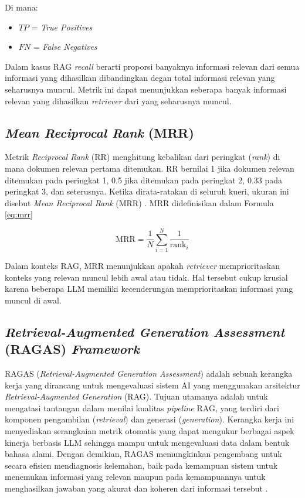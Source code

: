 Di mana:
\begin{itemize}
	\item $TP$ = \textit{True Positives}
	\item $FN$ = \textit{False Negatives}
\end{itemize}

Dalam kasus RAG \textit{recall} berarti proporsi banyaknya informasi relevan dari semua informasi yang dihasilkan dibandingkan degan total informasi relevan yang seharusnya muncul.
Metrik ini dapat menunjukkan seberapa banyak informasi relevan yang dihasilkan \textit{retriever} dari yang seharusnya muncul.

\subsection{\textit{Mean Reciprocal Rank} (MRR)}
Metrik \textit{Reciprocal Rank} (RR) menghitung kebalikan dari peringkat (\textit{rank}) di mana dokumen relevan pertama ditemukan.
RR bernilai 1 jika dokumen relevan ditemukan pada peringkat 1,  0.5 jika ditemukan pada peringkat 2,  0.33 pada peringkat 3, dan seterusnya.
Ketika dirata-ratakan di seluruh kueri, ukuran ini disebut \textit{Mean Reciprocal Rank} (MRR) \cite{craswell2016meanMRR}.
MRR didefinisikan dalam Formula \ref{eq:mrr}

\begin{equation}
	\label{eq:mrr}
	\mathrm{MRR} = \frac{1}{N} \sum_{i=1}^{N} \frac{1}{\text{rank}_i}
\end{equation}

Dalam konteks RAG, MRR menunjukkan apakah \textit{retriever} memprioritaskan konteks yang relevan muncul lebih awal atau tidak.
Hal tersebut cukup krusial karena beberapa LLM memiliki kecenderungan memprioritaskan informasi yang muncul di awal.

\subsection{\textit{Retrieval-Augmented Generation Assessment} (RAGAS) \textit{Framework}}

RAGAS (\textit{Retrieval-Augmented Generation Assessment}) adalah sebuah kerangka kerja yang dirancang untuk mengevaluasi sistem AI yang menggunakan arsitektur \textit{Retrieval-Augmented Generation} (RAG).
Tujuan utamanya adalah untuk mengatasi tantangan dalam menilai kualitas \textit{pipeline} RAG, yang terdiri dari komponen pengambilan (\textit{retrieval}) dan generasi (\textit{generation}).
Kerangka kerja ini menyediakan serangkaian metrik otomatis yang dapat mengukur berbagai aspek kinerja berbasis LLM sehingga mampu untuk mengevaluasi data dalam bentuk bahasa alami.
Dengan demikian, RAGAS memungkinkan pengembang untuk secara efisien mendiagnosis kelemahan, baik pada kemampuan sistem untuk menemukan informasi yang relevan maupun pada kemampuannya untuk menghasilkan jawaban yang akurat dan koheren dari informasi tersebut \cite{es2024ragas}.


